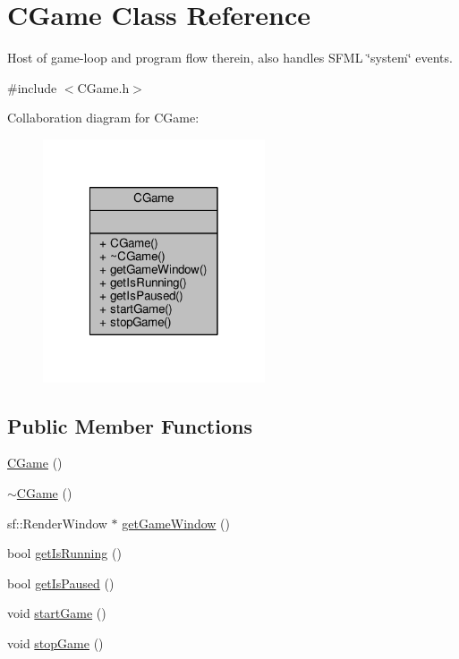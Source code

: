\hypertarget{classCGame}{\section{C\-Game Class Reference}
\label{classCGame}
}


Host of game-\/loop and program flow therein, also handles S\-F\-M\-L \char`\"{}system\char`\"{} events.  




{\ttfamily \#include $<$C\-Game.\-h$>$}



Collaboration diagram for C\-Game\-:\nopagebreak
\begin{figure}[H]
\begin{center}
\leavevmode
\includegraphics[width=186pt]{classCGame__coll__graph}
\end{center}
\end{figure}
\subsection*{Public Member Functions}
\begin{DoxyCompactItemize}
\item 
\hyperlink{classCGame_aa0b28c798a6198998d018047e96f188e}{C\-Game} ()
\item 
\hyperlink{classCGame_a4db10c09035dc16b32d6c1ef4cca2143}{$\sim$\-C\-Game} ()
\item 
sf\-::\-Render\-Window $\ast$ \hyperlink{classCGame_a9ed0bb7ef800bc7e568cf8858c3b96ec}{get\-Game\-Window} ()
\item 
bool \hyperlink{classCGame_ae45938d7b77b13d2e80e4f9b3a17a44a}{get\-Is\-Running} ()
\item 
bool \hyperlink{classCGame_a9b2f241693b1f024c957f92069fe6ed7}{get\-Is\-Paused} ()
\item 
void \hyperlink{classCGame_aa94f04e2c012603f10430a4d4db3ce27}{start\-Game} ()
\item 
void \hyperlink{classCGame_acbad86ee58748e2db0da540f4aa0640e}{stop\-Game} ()
\end{DoxyCompactItemize}


